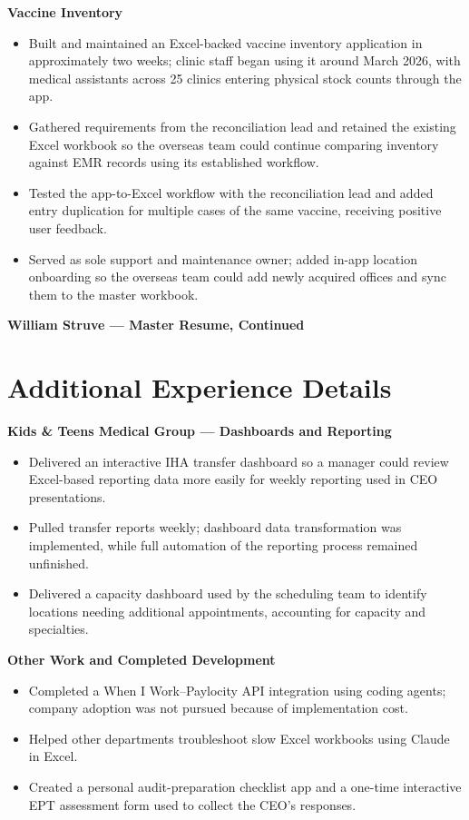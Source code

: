 \documentclass[10pt,letterpaper]{article}
\begin{document}
\textbf{Vaccine Inventory}\par
\begin{itemize}
\item Built and maintained an Excel-backed vaccine inventory application in approximately two weeks; clinic staff began using it around March 2026, with medical assistants across 25 clinics entering physical stock counts through the app.
\item Gathered requirements from the reconciliation lead and retained the existing Excel workbook so the overseas team could continue comparing inventory against EMR records using its established workflow.
\item Tested the app-to-Excel workflow with the reconciliation lead and added entry duplication for multiple cases of the same vaccine, receiving positive user feedback.
\item Served as sole support and maintenance owner; added in-app location onboarding so the overseas team could add newly acquired offices and sync them to the master workbook.
\end{itemize}

\newpage
{\large\bfseries William Struve --- Master Resume, Continued}\par

\section{Additional Experience Details}
\textbf{Kids \& Teens Medical Group --- Dashboards and Reporting}\par
\begin{itemize}
\item Delivered an interactive IHA transfer dashboard so a manager could review Excel-based reporting data more easily for weekly reporting used in CEO presentations.
\item Pulled transfer reports weekly; dashboard data transformation was implemented, while full automation of the reporting process remained unfinished.
\item Delivered a capacity dashboard used by the scheduling team to identify locations needing additional appointments, accounting for capacity and specialties.
\end{itemize}

\textbf{Other Work and Completed Development}\par
\begin{itemize}
\item Completed a When I Work--Paylocity API integration using coding agents; company adoption was not pursued because of implementation cost.
\item Helped other departments troubleshoot slow Excel workbooks using Claude in Excel.
\item Created a personal audit-preparation checklist app and a one-time interactive EPT assessment form used to collect the CEO's responses.
\end{itemize}
\end{document}
